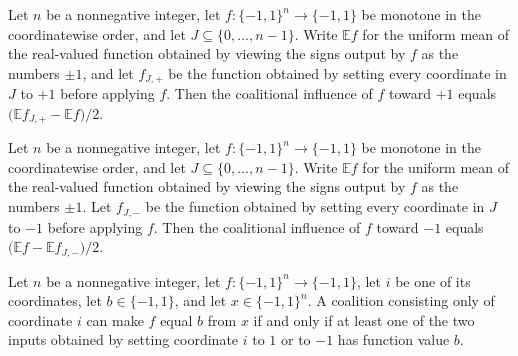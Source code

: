 \begin{theorem}
\label{FABL.coalitionalInfluenceToward_one_eq_mean_change}
\leanok
{}
Let $n$ be a nonnegative integer, let $f:\{-1,1\}^n\to\{-1,1\}$ be monotone in the
coordinatewise order, and let $J\subseteq\{0,\ldots,n-1\}$. Write $\mathbb E f$ for
the uniform mean of the real-valued function obtained by viewing the signs output by $f$
as the numbers $\pm1$, and let $f_{J,+}$ be the function obtained by setting every
coordinate in $J$ to $+1$ before applying $f$. Then the coalitional influence of $f$
toward $+1$ equals $\bigl(\mathbb E f_{J,+}-\mathbb E f\bigr)/2$.
\end{theorem}

\begin{theorem}
\label{FABL.coalitionalInfluenceToward_neg_one_eq_mean_change}
\leanok
{}
Let $n$ be a nonnegative integer, let $f:\{-1,1\}^n\to\{-1,1\}$ be monotone in the
coordinatewise order, and let $J\subseteq\{0,\ldots,n-1\}$. Write $\mathbb E f$ for
the uniform mean of the real-valued function obtained by viewing the signs output by $f$
as the numbers $\pm1$. Let $f_{J,-}$ be the function obtained by setting every
coordinate in $J$ to $-1$ before applying $f$. Then the coalitional influence of $f$
toward $-1$ equals $\bigl(\mathbb E f-\mathbb E f_{J,-}\bigr)/2$.
\end{theorem}

\begin{theorem}
\label{FABL.coalitionCanAttain_singleton_iff}
\leanok
{}
Let $n$ be a nonnegative integer, let $f:\{-1,1\}^n\to\{-1,1\}$, let $i$ be one of its
coordinates, let $b\in\{-1,1\}$, and let $x\in\{-1,1\}^n$. A coalition consisting only
of coordinate $i$ can make $f$ equal $b$ from $x$ if and only if at least one of the two
inputs obtained by setting coordinate $i$ to $1$ or to $-1$ has function value $b$.
\end{theorem}


